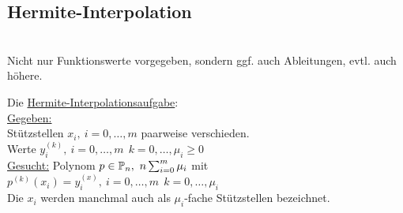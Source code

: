 \subsection{Hermite-Interpolation}\hfill\\
Nicht nur Funktionswerte vorgegeben, sondern ggf. auch Ableitungen, evtl. auch höhere.
\begin{definition}
    Die \underline{Hermite-Interpolationsaufgabe}:\\
    \underline{Gegeben:}\\ Stützstellen $x_i, \ i=0,\dots , m$ paarweise verschieden.\\
           \qquad Werte $y_i^{(k)}, \ i=0,\dots , m\ \ k=0,\dots, \mu_i \geq 0$\\
            
    \underline{Gesucht:} Polynom $p\in\bbP_n,\ n\sum_{i=0}^{m}\mu_i$ mit $p^{(k)}(x_i)=y_i^{(x)},\ i=0,\dots,m \ \ 
    k=0,\dots,\mu_i$\\
    Die $x_i$ werden manchmal auch als $\mu_i$-fache Stützstellen bezeichnet.
\end{definition}

